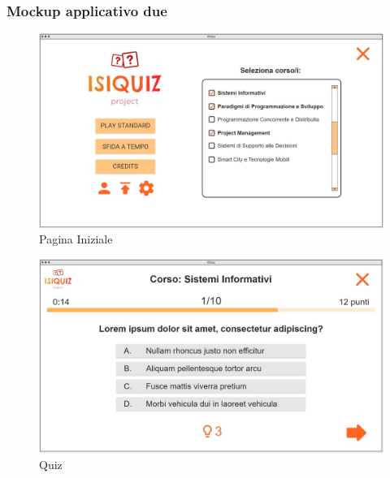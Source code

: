         \subsubsection{Mockup applicativo due}\label{mockup2}
        
        \begin{figure}[H]
            \centering
            \includegraphics[width=\textwidth]{Images/mockup/home2.jpg}
            \caption{Pagina Iniziale}
            \label{fig:HomePage2}
        \end{figure}
        
        \begin{figure}[H]
            \centering
            \includegraphics[width=\textwidth]{Images/mockup/quiz2.jpg}
            \caption{Quiz}
            \label{fig:Quiz2}
        \end{figure}
        
